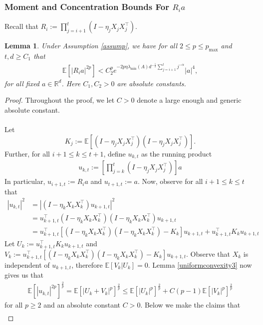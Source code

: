 \documentclass[11pt, reqno,english]{amsart}
\newtheorem{lemma}{Lemma}[section]
\begin{document}
\subsubsection{Moment and Concentration Bounds For $R_ia$}\label{R_i}
Recall that $R_i := \prod_{j = i+1}^{t}(I - \eta_{j} X_{j}X^\top_{j})$. 
\begin{lemma}\label{conc1}
Under Assumption \ref{assump}, we have for all $2 \leq p \leq p_{\max}$ and $t,d \geq C_1$ that
\begin{align*}
\mathbb{E}[|R_ia|^{2p}] < C_2^{p}e^{-2p \eta \lambda_{\min}(A)d^{-\frac{1}{2}}\sum_{j = i+1}^t j^{-\alpha}}|a|^4,
\end{align*}
for all fixed $a \in \mathbb{R}^d$. Here $C_1, C_2 > 0$ are absolute constants.
\end{lemma}
\begin{proof}
Throughout the proof, we let $C > 0$ denote a large enough and generic absolute constant.
\\\\
Let $$K_{j}:= \mathbb{E}[(I - \eta_{j}X_{j}X^\top_{j})(I - \eta_{j}X_{j}X^\top_{j})].$$
Further, for all $i+1 \leq k \leq t+1$, define $u_{k,t}$ as the running product
\begin{align*}
u_{k, t} := [\prod_{j = k}^{t}(I - \eta_{j}X_{j}X^\top_{j})]a
\end{align*}
In particular, $u_{i+1,t}:= R_ia$ and $u_{t+1, t} := a$. Now, observe for all $i+1 \leq k \leq t$ that
\begin{align*}
|u_{k,t}|^2
&= |(I - \eta_k X_kX_k^\top)u_{k+1,t}|^2
\\
&= u^{\top}_{k+1,t} (I - \eta_k X_k X_k^\top)(I - \eta_k X_k X_k^\top)u_{k+1,t}
\\
&= u_{k+1, t}^\top [(I - \eta_k X_k X_k^\top)(I - \eta_k X_k X_k^\top )- K_k]u_{k+1, t} + u_{k+1,t}^\top K_k u_{k+1,t}
\end{align*}
Let $U_k:= u_{k+1,t}^\top K_k u_{k+1,t}$ and $V_k := u^\top_{k+1,t}[(I - \eta_kX_kX_k^\top)(I - \eta_kX_kX_k^\top) - K_k]u_{k+1,t}$. Observe that $X_k$ is independent of $u_{k+1,t}$, therefore $\mathbb{E}[V_k|U_k] = 0$. Lemma \ref{uniformconvexity3} now gives us that
\begin{align*}
\mathbb{E}[|u_{k,t}|^{2p}]^{\frac{2}{p}} = \mathbb{E}[|U_k + V_k|^p]^{\frac{2}{p}} \leq \mathbb{E}[|U_k|^p]^{\frac{2}{p}} + C(p-1) \mathbb{E}[|V_k|^p]^{\frac{2}{p}}
\end{align*}
for all $p \geq 2$ and an absolute constant $C>0$. Below we make the claims that
\begin{align*}

\end{align*}
\end{proof}
\end{document}
